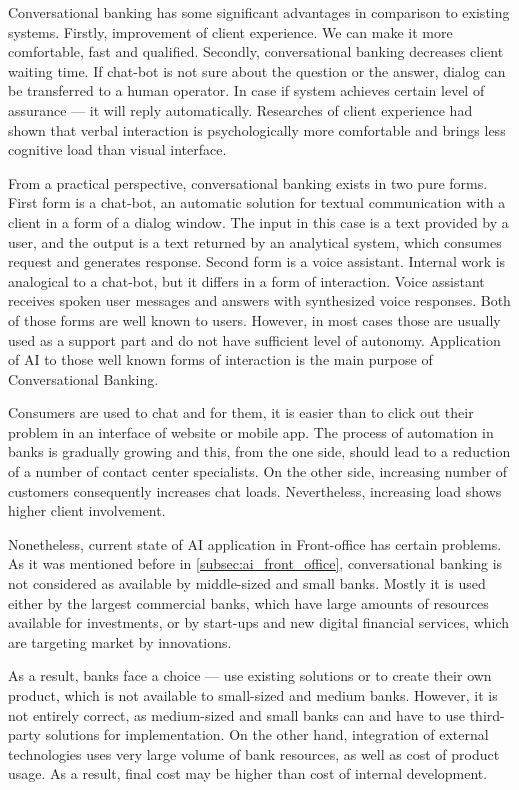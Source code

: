 Conversational banking has some significant advantages in comparison to existing systems.
Firstly, improvement of client experience. 
We can make it more comfortable, fast and qualified.
Secondly, conversational banking decreases client waiting time. 
If chat-bot is not sure about the question or the answer, dialog can be transferred to a human operator.
In case if system achieves certain level of assurance — it will reply automatically.
Researches of client experience had shown that verbal interaction is psychologically more comfortable and brings less cognitive load than visual interface.
\cite{accenture_conversational_banking}

From a practical perspective, conversational banking exists in two pure forms.
First form is a chat-bot, an automatic solution for textual communication with a client in a form of a dialog window.
The input in this case is a text provided by a user, and the output is a text returned by an analytical system, which consumes request and generates response.
Second form is a voice assistant. Internal work is analogical to a chat-bot, but it differs in a form of interaction.
Voice assistant receives spoken user messages and answers with synthesized voice responses.
Both of those forms are well known to users.
However, in most cases those are usually used as a support part and do not have sufficient level of autonomy.
Application of AI to those well known forms of interaction is the main purpose of Conversational Banking.

Consumers are used to chat and for them, it is easier than to click out their problem in an interface of website or mobile app.
The process of automation in banks is gradually growing and this, from the one side, should lead to a reduction of a number of contact center specialists.
On the other side, increasing number of customers consequently increases chat loads.
Nevertheless, increasing load shows higher client involvement.

Nonetheless, current state of AI application in Front-office has certain problems.
As it was mentioned before in \ref{subsec:ai_front_office}, conversational banking is not considered as available by middle-sized and small banks.
Mostly it is used either by the largest commercial banks, which have large amounts of resources available for investments, or by start-ups and new digital financial services, which are targeting market by innovations.

As a result, banks face a choice — use existing solutions or to create their own product, which is not available to small-sized and medium banks.
However, it is not entirely correct, as medium-sized and small banks can and have to use third-party solutions for implementation.
On the other hand, integration of external technologies uses very large volume of bank resources, as well as cost of product usage.
As a result, final cost may be higher than cost of internal development.

